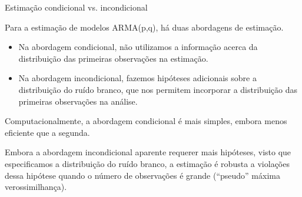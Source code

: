 \documentclass[11pt]{beamer}
\newenvironment{halfwideitemize}{\itemize\addtolength{\itemsep}{0.5em}}{\enditemize}
\begin{document}
\begin{frame}{Estimação condicional vs. incondicional}
	
	\begin{halfwideitemize}
		\item Para a estimação de modelos ARMA(p,q), há duas abordagens de estimação.
		\begin{itemize}
			\item Na abordagem {\color{blue} condicional}, não utilizamos a informação acerca da distribuição das primeiras observações na estimação.
			\item Na abordagem {\color{blue} incondicional}, fazemos hipóteses adicionais sobre a distribuição do ruído branco, que nos permitem incorporar a distribuição das primeiras observações na análise.
		\end{itemize}
		\item Computacionalmente, a abordagem condicional é mais simples, embora menos eficiente que a segunda.
		\item Embora a abordagem incondicional aparente requerer mais hipóteses, visto que especificamos a distribuição do ruído branco, a estimação é robusta a violações dessa hipótese quando o número de observações é grande (``pseudo'' máxima verossimilhança).  
	\end{halfwideitemize}
	
\end{frame}
\end{document}
